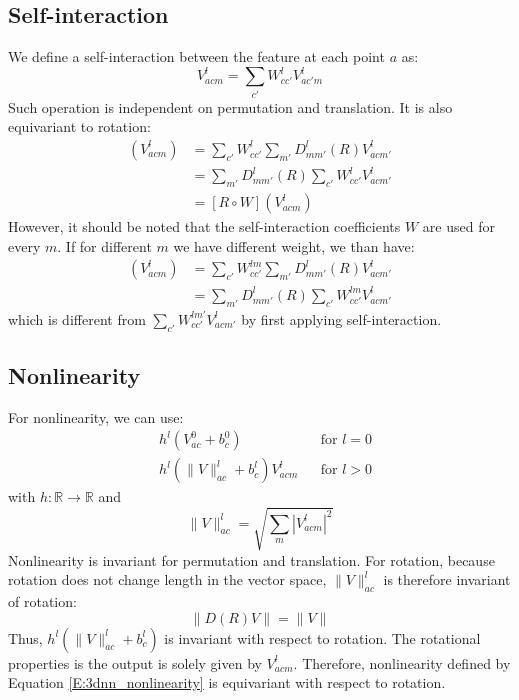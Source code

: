 \documentclass{article}
\begin{document}
\subsection*{Self-interaction}
We define a self-interaction between the feature at each point $a$ as:
\begin{equation}
    V_{acm}^{l} = \sum_{c'} W^{l}_{cc'} V_{ac'm}^{l} 
\end{equation}
Such operation is independent on permutation and translation. It is also equivariant to rotation:
\begin{align*}
    [ W \circ R ] (V_{acm}^l) &= \sum_{c'} W^{l}_{cc'} \sum_{m'}D_{mm'}^l(R)V_{acm'}^l \\
                &= \sum_{m'}D_{mm'}^l(R) \sum_{c'} W^{l}_{cc'}  V_{acm'}^l \\
                &= [ R \circ W ] (V_{acm}^l)
\end{align*}
However, it should be noted that the self-interaction coefficients $W$ are used for every $m$. 
If for different $m$ we have different weight, we than have:
\begin{align*}
    [ W \circ R ] (V_{acm}^l) &= \sum_{c'} W^{lm}_{cc'} \sum_{m'}D_{mm'}^l(R)V_{acm'}^l \\
                &= \sum_{m'}D_{mm'}^l(R) \sum_{c'} W^{lm}_{cc'}  V_{acm'}^l 
\end{align*}
which is different from $\sum_{c'} W^{lm'}_{cc'}  V_{acm'}^l$ by first applying self-interaction.

\subsection*{Nonlinearity}
For nonlinearity, we can use:
\begin{align*}
    &h^l (V_{ac}^0 + b_c^0) & &\text{for $l=0$} \\ 
    &h^l (\|V\|_{ac}^l + b_c^l)V_{acm}^{l} &  &\text{for $l>0$} \label{E:3dnn_nonlinearity}
\end{align*}
with $h\colon \mathbb{R}\to \mathbb{R}$ and 
\[ \|V\|_{ac}^l = \sqrt{\sum_m |V_{acm}^l|^2} \]
Nonlinearity is invariant for permutation and translation. For rotation, 
because rotation does not change length in the vector space, $\|V\|_{ac}^l$ is 
therefore invariant of rotation:
\begin{equation}
    \|D(R)V\| = \|V\|
\end{equation}
Thus, $h^l (\|V\|_{ac}^l + b_c^l)$ is invariant with respect to rotation. 
The rotational properties is the output is solely given by $V_{acm}^{l}$.
Therefore, nonlinearity defined by Equation \eqref{E:3dnn_nonlinearity} is equivariant
with respect to rotation.
\end{document}
